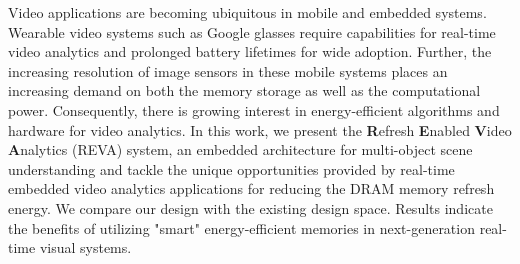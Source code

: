 Video applications are becoming ubiquitous in mobile and embedded systems. Wearable video systems such as Google glasses require capabilities for real-time video analytics and prolonged battery lifetimes for wide adoption. Further, the increasing resolution of image sensors in these mobile systems places an increasing demand on both the memory storage as well as the computational power. Consequently, there is growing interest in energy-efficient algorithms and hardware for video analytics. In this work, we present the \textbf{R}efresh \textbf{E}nabled \textbf{V}ideo \textbf{A}nalytics (REVA) system, an embedded architecture for multi-object scene understanding and tackle the unique opportunities provided by real-time embedded video analytics applications for reducing the DRAM memory refresh energy. We compare our design with the existing design space. Results indicate the benefits of utilizing "smart" energy-efficient memories in next-generation real-time visual systems. 
